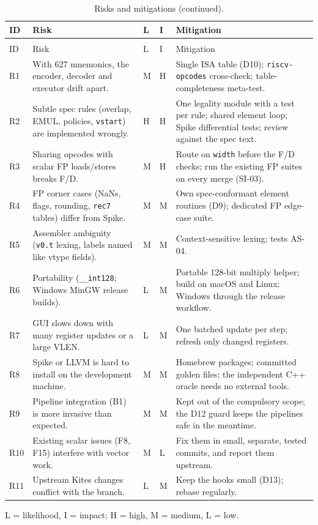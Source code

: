 \documentclass[11pt]{article}
\begin{document}
\small
\begin{longtable}{@{}L{0.7cm}L{4.6cm}L{0.5cm}L{0.5cm}L{8.1cm}@{}}
\caption{Risks and mitigations.}\label{tab:risks}\\
\toprule
ID & Risk & L & I & Mitigation \\
\midrule
\endfirsthead
\caption[]{Risks and mitigations (continued).}\\
\toprule
ID & Risk & L & I & Mitigation \\
\midrule
\endhead
R1 & With 627 mnemonics, the encoder, decoder and executor drift apart. & M & H & Single ISA table (D10); \texttt{riscv-opcodes} cross-check; table-completeness meta-test. \\
R2 & Subtle spec rules (overlap, EMUL, policies, \texttt{vstart}) are implemented wrongly. & H & H & One legality module with a test per rule; shared element loop; Spike differential tests; review against the spec text. \\
R3 & Sharing opcodes with scalar FP loads/stores breaks F/D. & M & H & Route on \texttt{width} before the F/D checks; run the existing FP suites on every merge (SI-03). \\
R4 & FP corner cases (NaNs, flags, rounding, \texttt{rec7} tables) differ from Spike. & M & M & Own spec-conformant element routines (D9); dedicated FP edge-case suite. \\
R5 & Assembler ambiguity (\texttt{v0.t} lexing, labels named like vtype fields). & M & M & Context-sensitive lexing; tests AS-04. \\
R6 & Portability (\texttt{\_\_int128}; Windows MinGW release builds). & L & M & Portable 128-bit multiply helper; build on macOS and Linux; Windows through the release workflow. \\
R7 & GUI slows down with many register updates or a large VLEN. & L & M & One batched update per step; refresh only changed registers. \\
R8 & Spike or LLVM is hard to install on the development machine. & M & M & Homebrew packages; committed golden files; the independent C++ oracle needs no external tools. \\
R9 & Pipeline integration (B1) is more invasive than expected. & M & M & Kept out of the compulsory scope; the D12 guard keeps the pipelines safe in the meantime. \\
R10 & Existing scalar issues (F8, F15) interfere with vector work. & M & L & Fix them in small, separate, tested commits, and report them upstream. \\
R11 & Upstream Kites changes conflict with the branch. & L & M & Keep the hooks small (D13); rebase regularly. \\
\bottomrule
\end{longtable}
\normalsize
\noindent L = likelihood, I = impact; H = high, M = medium, L = low.
\end{document}
